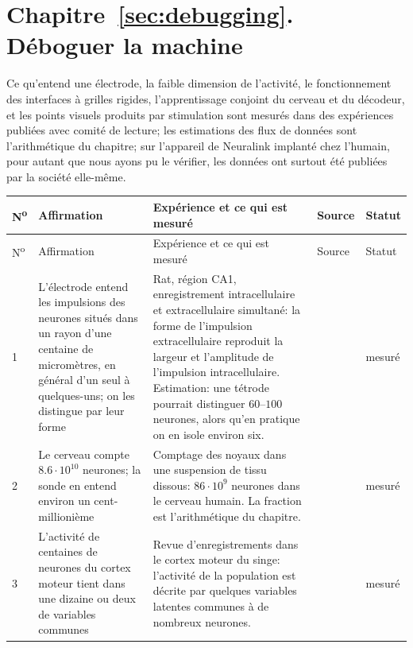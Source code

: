 \section{Chapitre~\ref{sec:debugging}. Déboguer la machine}

Ce qu'entend une électrode, la faible dimension de l'activité, le fonctionnement des interfaces à grilles rigides, l'apprentissage conjoint du cerveau et du décodeur, et les points visuels produits par stimulation sont mesurés dans des expériences publiées avec comité de lecture; les estimations des flux de données sont l'arithmétique du chapitre; sur l'appareil de Neuralink implanté chez l'humain, pour autant que nous ayons pu le vérifier, les données ont surtout été publiées par la société elle-même.

{\footnotesize
\setlength{\tabcolsep}{3pt}\renewcommand{\arraystretch}{1.15}
\begin{longtable}{>{\raggedright}p{0.5cm}>{\raggedright}p{4.0cm}>{\raggedright}p{5.6cm}>{\raggedright}p{2.3cm}>{\raggedright\arraybackslash}p{1.7cm}}
\toprule
N\textsuperscript{o} & Affirmation & Expérience et ce qui est mesuré & Source & Statut \\
\midrule\endfirsthead
\toprule
N\textsuperscript{o} & Affirmation & Expérience et ce qui est mesuré & Source & Statut \\
\midrule\endhead
1 & L'électrode entend les impulsions des neurones situés dans un rayon d'une centaine de micromètres, en général d'un seul à quelques-uns; on les distingue par leur forme & Rat, région CA1, enregistrement intracellulaire et extracellulaire simultané: la forme de l'impulsion extracellulaire reproduit la largeur et l'amplitude de l'impulsion intracellulaire. Estimation: une tétrode pourrait distinguer $60$--$100$ neurones, alors qu'en pratique on en isole environ six. & \cite{Henze2000extra} & mesuré \\
2 & Le cerveau compte $8.6\cdot10^{10}$ neurones; la sonde en entend environ un cent-millionième & Comptage des noyaux dans une suspension de tissu dissous: $86\cdot10^9$ neurones dans le cerveau humain. La fraction est l'arithmétique du chapitre. & \cite{Azevedo2009} & mesuré \\
3 & L'activité de centaines de neurones du cortex moteur tient dans une dizaine ou deux de variables communes & Revue d'enregistrements dans le cortex moteur du singe: l'activité de la population est décrite par quelques variables latentes communes à de nombreux neurones. & \cite{Gallego2017} & mesuré \\

\end{longtable}}
